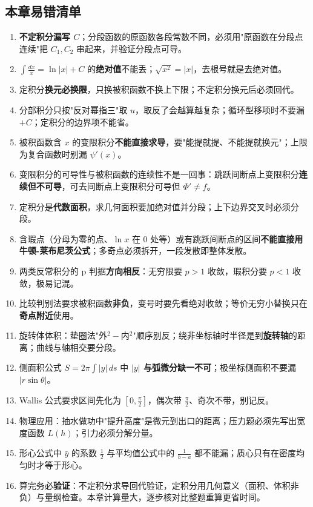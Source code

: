 \documentclass[11pt,openany,UTF8]{ctexbook}
\begin{document}
\subsection*{本章易错清单}

\begin{enumerate}
\item \textbf{不定积分漏写 $C$}；分段函数的原函数各段常数不同，必须用"原函数在分段点连续"把 $C_1,C_2$ 串起来，并验证分段点可导。
\item $\int\frac{dx}{x}=\ln\lvert x\rvert+C$ 的\textbf{绝对值}不能丢；$\sqrt{x^2}=\lvert x\rvert$，去根号就是去绝对值。
\item 定积分\textbf{换元必换限}，只换被积函数不换上下限；不定积分换元后必须回代。
\item 分部积分只按"反对幂指三"取 $u$，取反了会越算越复杂；循环型移项时不要漏 $+C$；定积分的边界项不能省。
\item 被积函数含 $x$ 的变限积分\textbf{不能直接求导}，要"能提就提、不能提就换元"；上限为复合函数时别漏 $\psi'(x)$。
\item 变限积分的可导性与被积函数的连续性不是一回事：跳跃间断点上变限积分\textbf{连续但不可导}，可去间断点上变限积分可导但 $\Phi'\neq f$。
\item 定积分是\textbf{代数面积}，求几何面积要加绝对值并分段；上下边界交叉时必须分段。
\item 含瑕点（分母为零的点、$\ln x$ 在 $0$ 处等）或有跳跃间断点的区间\textbf{不能直接用牛顿-莱布尼茨公式}；多奇点必须拆开，一段发散即整体发散。
\item 两类反常积分的 p 判据\textbf{方向相反}：无穷限要 $p>1$ 收敛，瑕积分要 $p<1$ 收敛，极易记混。
\item 比较判别法要求被积函数\textbf{非负}，变号时要先看绝对收敛；等价无穷小替换只在\textbf{奇点附近}使用。
\item 旋转体体积：垫圈法"外$^2-$内$^2$"顺序别反；绕非坐标轴时半径是到\textbf{旋转轴}的距离；曲线与轴相交要分段。
\item 侧面积公式 $S=2\pi\int\lvert y\rvert\,ds$ 中 \textbf{$\lvert y\rvert$ 与弧微分缺一不可}；极坐标侧面积不要漏 $\lvert r\sin\theta\rvert$。
\item Wallis 公式要求区间先化为 $[0,\frac{\pi}{2}]$，偶次带 $\frac{\pi}{2}$、奇次不带，别记反。
\item 物理应用：抽水做功中"提升高度"是微元到出口的距离；压力题必须先写出宽度函数 $L(h)$；引力必须分解分量。
\item 形心公式中 $\bar{y}$ 的系数 $\frac{1}{2}$ 与平均值公式中的 $\frac{1}{b-a}$ 都不能漏；质心只有在密度均匀时才等于形心。
\item 算完务必\textbf{验证}：不定积分求导回代验证，定积分用几何意义（面积、体积非负）与量纲检查。本章计算量大，逐步核对比整题重算更省时间。
\end{enumerate}
\end{document}
